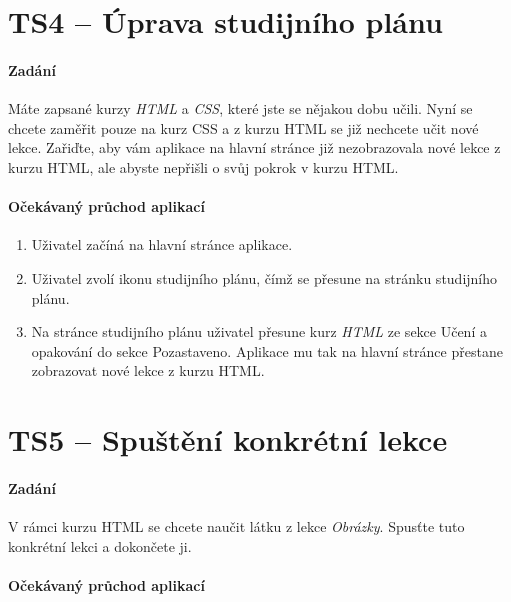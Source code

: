 \section{TS4 -- Úprava studijního plánu}

\paragraph{Zadání} Máte zapsané kurzy \textit{HTML} a \textit{CSS}, které jste se nějakou dobu učili. Nyní se chcete zaměřit pouze na kurz CSS a z kurzu HTML se již nechcete učit nové lekce. Zařiďte, aby vám aplikace na hlavní stránce již nezobrazovala nové lekce z kurzu HTML, ale abyste nepřišli o svůj pokrok v kurzu HTML.

\paragraph{Očekávaný průchod aplikací}

\begin{enumerate}
    \item Uživatel začíná na hlavní stránce aplikace.
    \item Uživatel zvolí ikonu studijního plánu, čímž se přesune na stránku studijního plánu.
    \item Na stránce studijního plánu uživatel přesune kurz \textit{HTML} ze sekce Učení a opakování do sekce Pozastaveno. Aplikace mu tak na hlavní stránce přestane zobrazovat nové lekce z kurzu HTML.
\end{enumerate}

\section{TS5 -- Spuštění konkrétní lekce}

\paragraph{Zadání} V rámci kurzu HTML se chcete naučit látku z lekce \textit{Obrázky}. Spusťte tuto konkrétní lekci a dokončete ji.

\paragraph{Očekávaný průchod aplikací}

